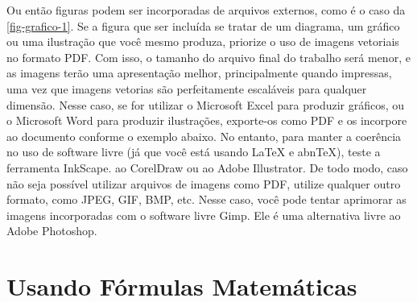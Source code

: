 \begin{figure}[h!]
	\centering
\end{figure}

Ou então figuras podem ser incorporadas de arquivos externos, como é o caso da \autoref{fig-grafico-1}. Se a figura que ser incluída se tratar de um diagrama, um gráfico ou uma ilustração que você mesmo produza, priorize o uso de imagens vetoriais no formato PDF. Com isso, o tamanho do arquivo final do trabalho será menor, e as imagens terão uma apresentação melhor, principalmente quando impressas, uma vez que imagens vetorias são perfeitamente escaláveis para qualquer dimensão. Nesse caso, se for utilizar o Microsoft Excel para produzir gráficos, ou o Microsoft Word para produzir ilustrações, exporte-os como PDF e os incorpore ao documento conforme o exemplo abaixo. No entanto, para manter a coerência no uso de software livre (já que você está usando LaTeX e abnTeX),  teste a ferramenta InkScape. ao CorelDraw ou ao Adobe Illustrator.  De todo modo, caso não seja possível  utilizar arquivos de imagens como PDF, utilize qualquer outro formato, como JPEG, GIF, BMP, etc.  Nesse caso, você pode tentar aprimorar as imagens incorporadas com o software livre Gimp. Ele é uma alternativa livre ao Adobe Photoshop.

\section{Usando Fórmulas Matemáticas}


